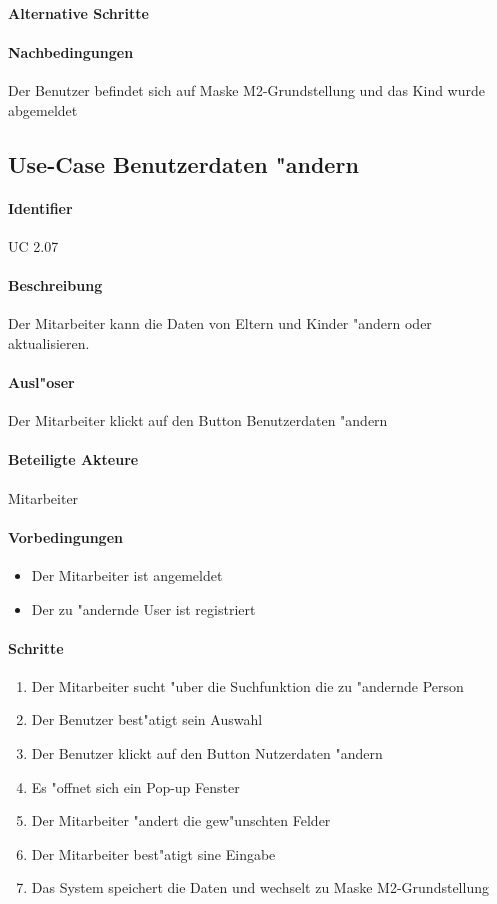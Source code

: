   \paragraph{Alternative Schritte}
  \paragraph{Nachbedingungen}
  Der Benutzer befindet sich auf Maske M2-Grundstellung und das Kind wurde abgemeldet

  
  \newpage
 \subsection{Use-Case Benutzerdaten "andern}
  \paragraph{Identifier}
  UC 2.07
  \paragraph{Beschreibung}
  Der Mitarbeiter kann die Daten von Eltern und Kinder "andern oder aktualisieren.
  \paragraph{Ausl"oser}
  Der Mitarbeiter klickt auf den Button \dq Benutzerdaten "andern\dq
  \paragraph{Beteiligte Akteure}   \leavevmode \newline
    Mitarbeiter
  \paragraph{Vorbedingungen}
  \begin{itemize}
   \item Der Mitarbeiter ist angemeldet
   \item Der zu "andernde User ist registriert
  \end{itemize}

  \paragraph{Schritte}
  \begin{enumerate}
   \item Der Mitarbeiter sucht "uber die Suchfunktion die zu "andernde Person
   \item Der Benutzer best"atigt sein Auswahl
   \item Der Benutzer klickt auf den Button \dq Nutzerdaten "andern\dq
   \item Es "offnet sich ein Pop-up Fenster
   \item Der Mitarbeiter "andert die gew"unschten Felder
   \item Der Mitarbeiter best"atigt sine Eingabe
   \item Das System speichert die Daten und wechselt zu Maske M2-Grundstellung
  \end{enumerate}

